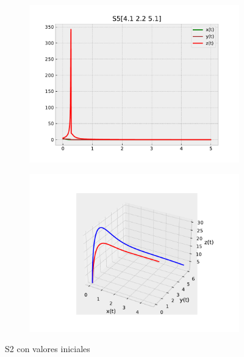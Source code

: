 \documentclass{wscpaperproc}
\theoremstyle{wsc}
\begin{document}
\begin{figure}[h]
	\centering
	\begin{subfigure}[b]{0.5\textwidth}
		\centering
		\includegraphics[width=\textwidth]{Simulations/S5[4.1 2.2 5.1].pdf}
	
		\label{fig:comparativa91}
	\end{subfigure}%
	\begin{subfigure}[b]{0.5\textwidth}
		\centering
		\includegraphics[width=\textwidth]{Simulations/S13d.pdf}
		\label{fig:comparativa92}
	\end{subfigure}
	\caption{S2 con valores iniciales}

	\label{fig:comparacion15}
\end{figure}
\end{document}
